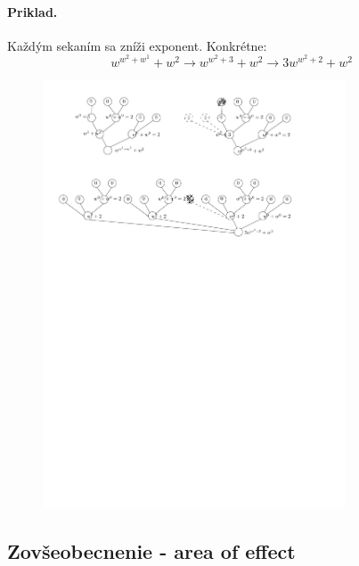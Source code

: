 \documentclass[12pt,a4paper]{article}
\begin{document}
\begin{samepage} 
\paragraph{Priklad.} 
Každým sekaním sa zníži exponent. Konkrétne: 
\begin{equation}
w^{w^2 + w^1} + w^2 \rightarrow w^{w^2 + 3} + w^2  \rightarrow 3w^{w^2 + 2} + w^2
\end{equation}
\begin{figure}[H]
\centering
\includegraphics[width=0.8\textwidth]{priklad.pdf}
\end{figure} 
\end{samepage} 

\subsection*{Zovšeobecnenie - area of effect} 
\end{document}
